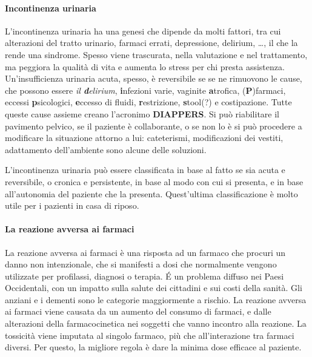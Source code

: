 \paragraph{Incontinenza urinaria} L'incontinenza urinaria ha una genesi
che dipende da molti fattori, tra cui alterazioni del tratto urinario, farmaci
errati, depressione, delirium, \dots, il che la rende una sindrome.
Spesso viene trascurata, nella valutazione e nel trattamento, ma peggiora la
qualità di vita e aumenta lo stress per chi presta assistenza.
Un'insufficienza urinaria acuta, spesso, è reversibile se se ne rimuovono le
cause, che possono essere \textit{il \textbf{d}elirium}, \textbf{i}nfezioni
varie, vaginite \textbf{a}trofica, (\textbf{P})farmaci, eccessi
\textbf{p}sicologici, \textbf{e}ccesso di fluidi, \textbf{r}estrizione,
\textbf{s}tool(?) e costipazione. Tutte queste cause assieme creano l'acronimo
\textbf{DIAPPERS}. Si può riabilitare il pavimento pelvico, se il paziente è
collaborante, o se non lo è si può procedere a modificare la situazione attorno
a lui: cateterismi, modificazioni dei vestiti, adattamento dell'ambiente sono
alcune delle soluzioni.

L'incontinenza urinaria può essere classificata in base al fatto se sia acuta e
reversibile, o cronica e persistente, in base al modo con cui si presenta, e in
base all'autonomia del paziente che la presenta. Quest'ultima classificazione
è molto utile per i pazienti in casa di riposo.

\paragraph{La reazione avversa ai farmaci} La reazione avversa ai farmaci è una
risposta ad un farmaco che procuri un danno non intenzionale, che si manifesti a
dosi che normalmente vengono utilizzate per profilassi, diagnosi o terapia.
\'E un problema diffuso nei Paesi Occidentali, con un impatto sulla salute dei
cittadini e sui costi della sanità. Gli anziani e i dementi sono le categorie
maggiormente a rischio.
La reazione avversa ai farmaci viene causata da un aumento del consumo di
farmaci, e dalle alterazioni della farmacocinetica nei soggetti che vanno
incontro alla reazione. La tossicità viene imputata al singolo farmaco, più che
all'interazione tra farmaci diversi. Per questo, la migliore regola è dare la
minima dose efficace al paziente.

